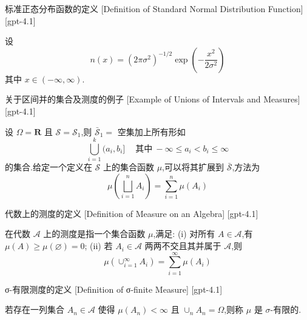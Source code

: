 \documentclass[UTF8]{ctexart}
\begin{document}
    
    
    \begin{dfn}
        {标准正态分布函数的定义}
        [Definition of Standard Normal Distribution Function]
        [gpt-4.1]
        
设
\[
n(x) = (2\pi\sigma^2)^{-1/2} \exp\left(-\frac{x^2}{2\sigma^2}\right)
\]
其中 $x \in (-\infty, \infty)$.

    \end{dfn}
    
    
    
    \begin{xmp}
        {关于区间并的集合及测度的例子}
        [Example of Unions of Intervals and Measures]
        [gpt-4.1]
        
设 $\Omega = \mathbf{R}$ 且 $\mathcal{S} = \mathcal{S}_1$,则 $\bar{\mathcal{S}}_1 =$ 空集加上所有形如
\[
\bigcup_{i = 1}^{k} (a_i, b_i] \quad \mathrm{~其中~} -\infty \leq a_i < b_i \leq \infty
\]
的集合.给定一个定义在 $\mathcal{S}$ 上的集合函数 $\mu$,可以将其扩展到 $\bar{\mathcal{S}}$,方法为
\[
\mu\left(\bigsqcup_{i = 1}^{n} A_i\right) = \sum_{i = 1}^{n} \mu(A_i)
\]

    \end{xmp}
    
    
    
    \begin{dfn}
        {代数上的测度的定义}
        [Definition of Measure on an Algebra]
        [gpt-4.1]
        
在代数 $\mathcal{A}$ 上的测度是指一个集合函数 $\mu$,满足:
(i) 对所有 $A \in \mathcal{A}$,有 $\mu(A) \geq \mu(\varnothing) = 0$;
(ii) 若 $A_i \in \mathcal{A}$ 两两不交且其并属于 $\mathcal{A}$,则
\[
\mu \left( \cup _ { i = 1 } ^ { \infty } A _ { i } \right) = \sum _ { i = 1 } ^ { \infty } \mu ( A _ { i } )
\]

    \end{dfn}
    
    
    
    \begin{dfn}
        {σ-有限测度的定义}
        [Definition of σ-finite Measure]
        [gpt-4.1]
        
若存在一列集合 $A_n \in \mathcal{A}$ 使得 $\mu(A_n) < \infty$ 且 $\cup_n A_n = \Omega$,则称 $\mu$ 是 $\sigma$-有限的.

    \end{dfn}
    
\end{document}
